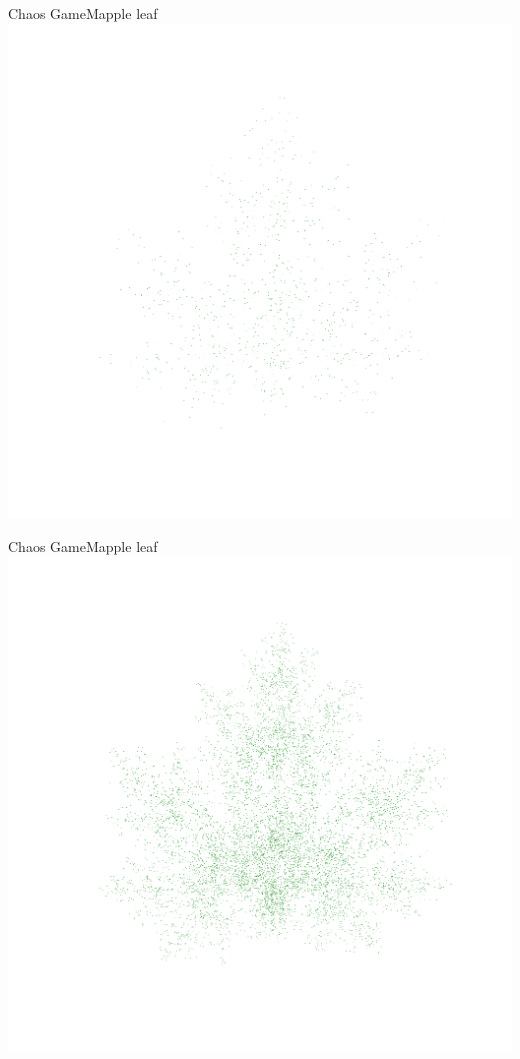 \documentclass[usenames,dvipsnames,svgnames,10pt,aspectratio=169]{beamer}
\begin{document}
\begin{frame}[t, c]{Chaos Game}{Mapple leaf}
	\centering
	\includegraphics[height=.8\textheight]{Mapple_leaf_2}
	\vspace{1cm}
\end{frame}

\begin{frame}[t, c]{Chaos Game}{Mapple leaf}
	\centering
	\includegraphics[height=.8\textheight]{Mapple_leaf_3}
	\vspace{1cm}
\end{frame}
\end{document}
